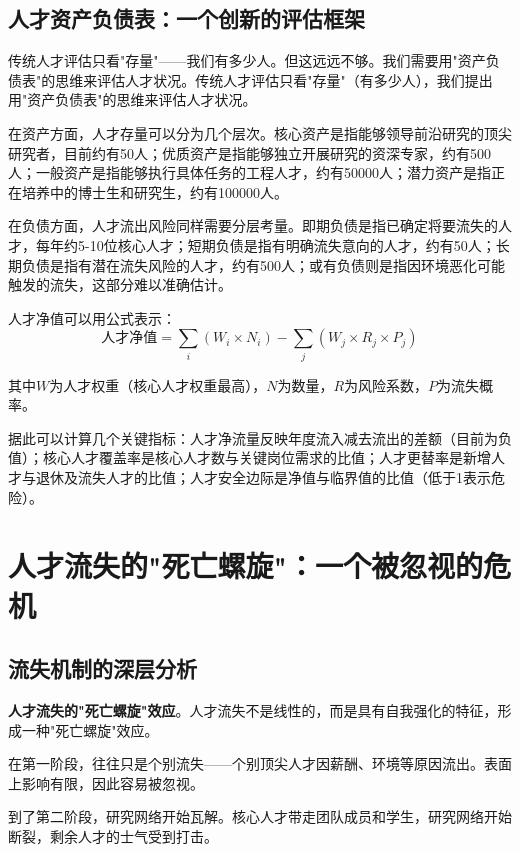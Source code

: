 \subsection{人才资产负债表：一个创新的评估框架}

传统人才评估只看"存量"——我们有多少人。但这远远不够。我们需要用"资产负债表"的思维来评估人才状况。传统人才评估只看"存量"（有多少人），我们提出用"资产负债表"的思维来评估人才状况。

在资产方面，人才存量可以分为几个层次。核心资产是指能够领导前沿研究的顶尖研究者，目前约有50人；优质资产是指能够独立开展研究的资深专家，约有500人；一般资产是指能够执行具体任务的工程人才，约有50000人；潜力资产是指正在培养中的博士生和研究生，约有100000人。

在负债方面，人才流出风险同样需要分层考量。即期负债是指已确定将要流失的人才，每年约5-10位核心人才；短期负债是指有明确流失意向的人才，约有50人；长期负债是指有潜在流失风险的人才，约有500人；或有负债则是指因环境恶化可能触发的流失，这部分难以准确估计。

人才净值可以用公式表示：
\begin{equation}
\text{人才净值} = \sum_{i} (W_i \times N_i) - \sum_{j} (W_j \times R_j \times P_j)
\end{equation}

其中$W$为人才权重（核心人才权重最高），$N$为数量，$R$为风险系数，$P$为流失概率。

据此可以计算几个关键指标：人才净流量反映年度流入减去流出的差额（目前为负值）；核心人才覆盖率是核心人才数与关键岗位需求的比值；人才更替率是新增人才与退休及流失人才的比值；人才安全边际是净值与临界值的比值（低于1表示危险）。

\section{人才流失的"死亡螺旋"：一个被忽视的危机}

\subsection{流失机制的深层分析}

\textbf{人才流失的"死亡螺旋"效应}。人才流失不是线性的，而是具有自我强化的特征，形成一种"死亡螺旋"效应。

在第一阶段，往往只是个别流失——个别顶尖人才因薪酬、环境等原因流出。表面上影响有限，因此容易被忽视。

到了第二阶段，研究网络开始瓦解。核心人才带走团队成员和学生，研究网络开始断裂，剩余人才的士气受到打击。

